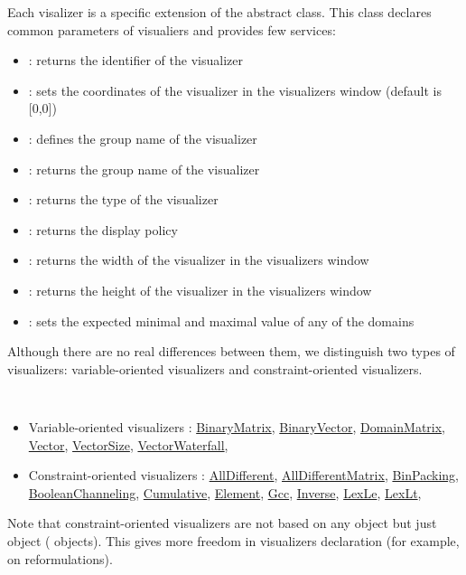 \medskip
Each visalizer is a specific extension of the abstract  class. This class declares common parameters of visualiers and provides few services:
\begin{itemize}
\item {} : returns the identifier of the visualizer
\item {} : sets the coordinates of the visualizer in the visualizers window (default is [0,0])
\item {}: defines the group name of the visualizer
\item {}: returns the group name of the visualizer
\item {}: returns the type of the visualizer
\item {}: returns the display policy
\item {}: returns the width of the visualizer in the visualizers window
\item {}: returns the height of the visualizer in the visualizers window
\item {}: sets the expected minimal and maximal value of any of the domains
\end{itemize}
 
 Although there are no real differences between them, we distinguish two types of visualizers: variable-oriented visualizers and constraint-oriented visualizers.
\medskip
\begin{notedef}\tt
\begin{itemize}
\item Variable-oriented visualizers : \hyperlink{binarymatrix:visu}{BinaryMatrix}, \hyperlink{binaryvector:visu}{BinaryVector}, \hyperlink{domainmatrix:visu}{DomainMatrix}, \hyperlink{vector:visu}{Vector}, \hyperlink{vectorsize:visu}{VectorSize}, \hyperlink{vectorwaterfall:visu}{VectorWaterfall},
\item Constraint-oriented visualizers : \hyperlink{alldiff:visu}{AllDifferent}, \hyperlink{alldiffmatrix:visu}{AllDifferentMatrix}, \hyperlink{binpacking:visu}{BinPacking}, \hyperlink{boolchan:visu}{BooleanChanneling}, \hyperlink{cumulative:visu}{Cumulative}, \hyperlink{element:visu}{Element}, \hyperlink{gcc:visu}{Gcc}, \hyperlink{inverse:visu}{Inverse}, \hyperlink{lexle:visu}{LexLe}, \hyperlink{lexlt:visu}{LexLt},    
\end{itemize}
\end{notedef}
Note that constraint-oriented visualizers are not based on any  object but just  object ( objects). This gives more freedom in visualizers declaration (for example, on reformulations).

